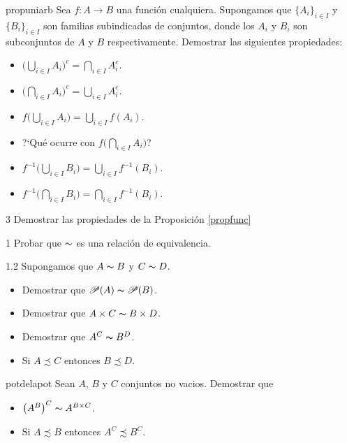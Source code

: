 \begin{ejercicio}{propuniarb} Sea $f:A\longrightarrow B$ una función cualquiera.
Supongamos que $\{A_i\}_{i\in I}$ y $\{B_i\}_{i\in I}$ son
familias subindicadas de conjuntos, donde los $A_i$ y $B_i$ son
subconjuntos de $A$ y $B$ respectivamente. Demostrar las
siguientes propiedades:

\begin{itemize}
\item[1.] $\biggl(\bigcup_{i\in I}A_i\biggr)^c=\bigcap_{i\in
I}A_i^c$.
\item[2.]$\biggl(\bigcap_{i\in I}A_i\biggr)^c=\bigcup_{i\in
I}A_i^c$.
\item[3.] $f\biggl(\bigcup_{i\in I}A_i\biggr)=\bigcup_{i\in
I}f(A_i)$.
\item[4.]?`Qué ocurre con $f\biggl(\bigcap_{i\in I}A_i\biggr)$?
\item[5.] $f^{-1}\biggl(\bigcup_{i\in I}B_i\biggr)=\bigcup_{i\in
I}f^{-1}(B_i)$.
\item[6.]$f^{-1}\biggl(\bigcap_{i\in I}B_i\biggr)=\bigcap_{i\in
I}f^{-1}(B_i)$.
\end{itemize}
\end{ejercicio}
\begin{ejercicio}{3} Demostrar las propiedades de la
Proposición \vref{propfunc}
\end{ejercicio}
\begin{ejercicio}{1} Probar que $\thicksim$ es una
relación de equivalencia.
\end{ejercicio}
\begin{ejercicio}{1.2} Supongamos que $A\thicksim B$ y
$C\thicksim D$.
\begin{itemize}
\item[1.] Demostrar que $\mathscr{P}(A)\thicksim \mathscr{P}(B)$.
\item[2.] Demostrar que $A\times C\thicksim B\times D$.
\item[3.] Demostrar que $A^C\thicksim B^D$.
\item[4.] Si $A\precsim C$ entonces $B\precsim D$.
\end{itemize}
\end{ejercicio}
\begin{ejercicio}{potdelapot} Sean $A$, $B$ y $C$ conjuntos
no vacios. Demostrar que
\begin{itemize}
\item[1.] $\bigl(A^{B}\bigr)^C\thicksim A^{B\times C}$.
\item[2.] Si $A\precsim B$ entonces $A^C\precsim B^C$.
\end{itemize}
\end{ejercicio}

